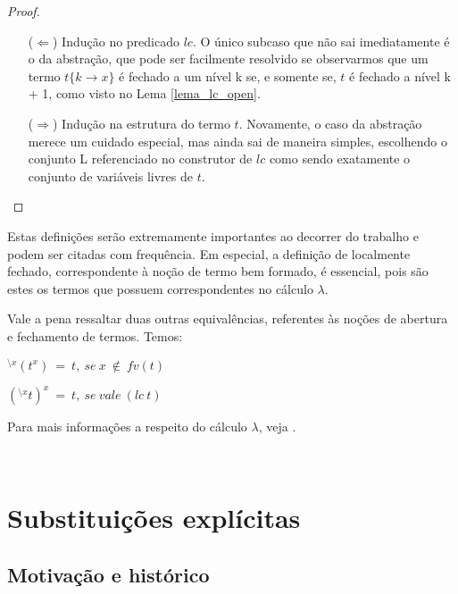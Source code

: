 \begin{proof} 
    $ $\par\nobreak\ignorespaces
\begin{itemize}
    \item[($\Leftarrow$)] Indução no predicado $lc$. O único
        subcaso que não sai imediatamente é o da abstração, que pode ser
        facilmente resolvido se observarmos que um termo $t\{k \rightarrow x\}$
        é fechado a um nível k se, e somente se, $t$ é fechado a nível k + 1,
        como visto no Lema \ref{lema_lc_open}.
    \item[($\Rightarrow$)] Indução na estrutura do termo $t$.
        Novamente, o caso da abstração merece um cuidado especial, mas ainda sai
        de maneira simples, escolhendo o conjunto L referenciado no construtor
        de $lc$ como sendo exatamente o conjunto de variáveis livres de $t$.
\end{itemize}
\end{proof}

Estas definições serão extremamente importantes ao decorrer do trabalho e podem
ser citadas com frequência. Em especial, a definição de localmente fechado,
correspondente à noção de termo bem formado, é essencial, pois são estes os
termos que possuem correspondentes no cálculo $\lambda$.

Vale a pena ressaltar duas outras equivalências, referentes às noções de
abertura e fechamento de termos. Temos:

\begin{lema}
    $^{\setminus x}(t^{x})\ =\ t,\ se\ x\ \notin\ fv(t) $
\end{lema}
\begin{lema}
    $(^{\setminus x}t)^{x}\ =\ t,\ se\ vale\ (lc\ t)$
\end{lema}

Para mais informações a respeito do cálculo $\lambda$, veja \cite{barendregt}.

\



\section{Substituições explícitas}

\subsection{Motivação e histórico}


